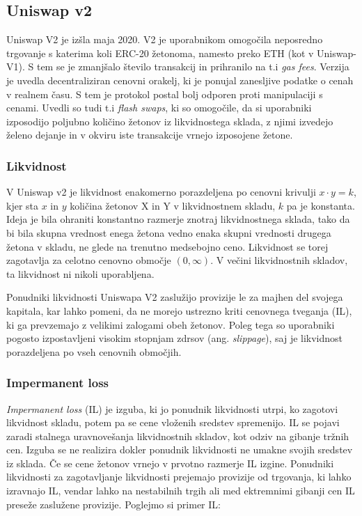 \documentclass[a4paper,12pt]{article}%
\begin{document}
\subsection{Uniswap v2}
Uniswap V2 je izšla maja 2020. V2 je uporabnikom omogočila neposredno trgovanje s katerima koli ERC-20 žetonoma, namesto preko ETH (kot v Uniswap-V1). S tem se je zmanjšalo število transakcij in prihranilo na t.i \textit{gas fees}. Verzija je uvedla decentraliziran cenovni orakelj, ki je ponujal zanesljive podatke o cenah v realnem času. S tem je protokol postal bolj odporen proti manipulaciji s cenami. Uvedli so tudi t.i \textit{flash swaps}, ki so omogočile, da si uporabniki izposodijo poljubno količino žetonov iz likvidnostega sklada, z njimi izvedejo želeno dejanje in v okviru iste transakcije vrnejo izposojene žetone. 

\subsubsection{Likvidnost} 
V Uniswap v2 je likvidnost enakomerno porazdeljena po cenovni krivulji $x\cdot y = k$, kjer sta $x$ in $y$ količina žetonov X in Y v likvidnostnem skladu, $k$ pa je konstanta. Ideja je bila ohraniti konstantno razmerje znotraj likvidnostnega sklada, tako da bi bila skupna vrednost enega žetona vedno enaka skupni vrednosti drugega žetona v skladu, ne glede na trenutno medsebojno ceno.  Likvidnost se torej zagotavlja za celotno cenovno območje $(0,\infty)$. V večini likvidnostnih skladov, ta likvidnost ni nikoli uporabljena. 

Ponudniki likvidnosti Uniswapa V2 zaslužijo provizije le za majhen del svojega kapitala, kar lahko pomeni, da ne morejo ustrezno kriti cenovnega tveganja (IL), ki ga prevzemajo z velikimi zalogami obeh žetonov. Poleg tega so uporabniki pogosto izpostavljeni visokim stopnjam zdrsov (ang. \textit{slippage}), saj je likvidnost porazdeljena po vseh cenovnih območjih. 




\subsubsection{Impermanent loss}
\textit{Impermanent loss} (IL) je izguba, ki jo ponudnik likvidnosti utrpi, ko zagotovi likvidnost skladu, potem pa se cene vloženih sredstev spremenijo. IL se pojavi zaradi stalnega uravnovešanja likvidnostnih skladov, kot odziv na gibanje tržnih cen. Izguba se ne realizira dokler ponudnik likvidnosti ne umakne svojih sredstev iz sklada. Če se cene žetonov vrnejo v prvotno razmerje IL izgine. Ponudniki likvidnosti za zagotavljanje likvidnosti prejemajo provizije od trgovanja, ki lahko izravnajo IL, vendar lahko na nestabilnih trgih ali med ektremnimi gibanji cen IL preseže zaslužene provizije. 
\newline
Poglejmo si primer IL:
\end{document}
